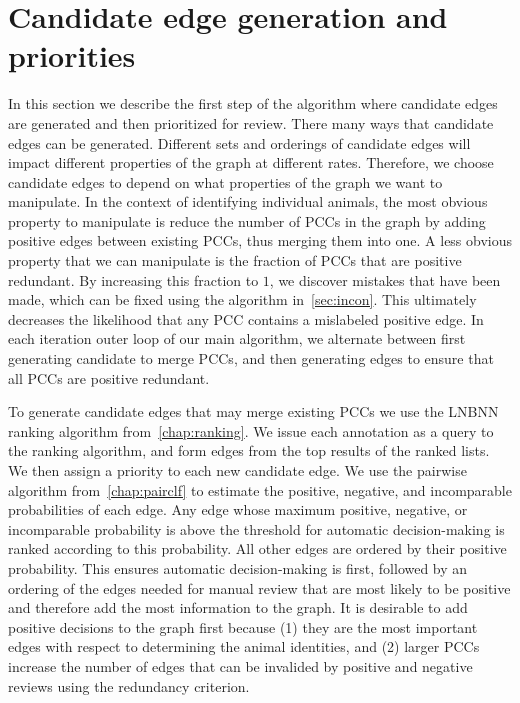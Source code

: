 

\section{Candidate edge generation and priorities}\label{sec:cand}

In this section we describe the first step of the algorithm where candidate edges are generated and then
  prioritized for review.
There many ways that candidate edges can be generated.
Different sets and orderings of candidate edges will impact different properties of the graph at different rates.
Therefore, we choose candidate edges to depend on what properties of the graph we want to manipulate.
In the context of identifying individual animals, the most obvious property to manipulate is reduce the number of
  PCCs in the graph by adding positive edges between existing PCCs, thus merging them into one.
A less obvious property that we can manipulate is the fraction of PCCs that are positive redundant.
By increasing this fraction to $1$, we discover mistakes that have been made, which can be fixed using the
  algorithm in~\cref{sec:incon}.
This ultimately decreases the likelihood that any PCC contains a mislabeled positive edge.
In each iteration outer loop of our main algorithm, we alternate between first generating candidate to merge
  PCCs, and then generating edges to ensure that all PCCs are positive redundant.

To generate candidate edges that may merge existing PCCs we use the LNBNN ranking algorithm
  from~\cref{chap:ranking}.
We issue each annotation as a query to the ranking algorithm, and form edges from the top results of the ranked
  lists.
We then assign a priority to each new candidate edge.
We use the pairwise algorithm from~\cref{chap:pairclf} to estimate the positive, negative, and incomparable
  probabilities of each edge.
Any edge whose maximum positive, negative, or incomparable probability is above the threshold for automatic
  decision-making is ranked according to this probability.
All other edges are ordered by their positive probability.
This ensures automatic decision-making is first, followed by an ordering of the edges needed for manual review
  that are most likely to be positive and therefore add the most information to the graph.
It is desirable to add positive decisions to the graph first because
(1) they are the most important edges with respect to determining the animal identities, and
(2) larger PCCs increase the number of edges that can be invalided by positive and negative reviews using the
  redundancy criterion.

